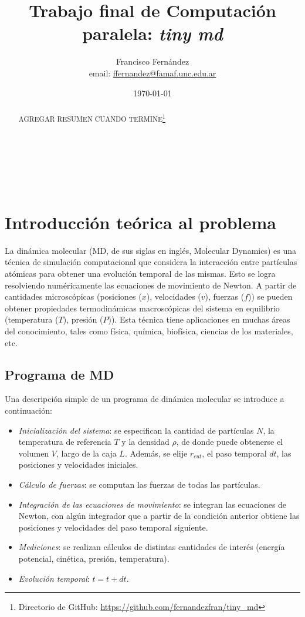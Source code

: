 \documentclass[a4paper,spanish,12pt,twoside]{article}
\title{Trabajo final de Computación paralela: \textit{tiny md}}
\author{Francisco Fernández \\ \small{email: \href{mailto:ffernandez@famaf.unc.edu.ar}{ffernandez@famaf.unc.edu.ar}}}
\date{\today}
\begin{document}
\maketitle

\

\

\begin{abstract}

AGREGAR RESUMEN CUANDO TERMINE\footnote{Directorio de GitHub: \url{https://github.com/fernandezfran/tiny_md}}%


\end{abstract}


\section{Introducción teórica al problema}

La dinámica molecular (MD, de sus siglas en inglés, Molecular Dynamics) es una técnica de simulación computacional que considera la interacción entre partículas atómicas para obtener una evolución temporal de las mismas. Esto se logra resolviendo numéricamente las ecuaciones de movimiento de Newton. A partir de cantidades microscópicas (posiciones ($x$), velocidades ($v$), fuerzas ($f$)) se pueden obtener propiedades termodinámicas macroscópicas del sistema en equilibrio (temperatura ($T$), presión ($P$)). Esta técnica tiene aplicaciones en muchas áreas del conocimiento, tales como física, química, biofísica, ciencias de los materiales, etc.

\subsection{Programa de MD}

Una descripción simple de un programa de dinámica molecular se introduce a continuación:

\begin{itemize}
 \item \textit{Inicialización del sistema}: se especifican la cantidad de partículas $N$, la temperatura de referencia $T$ y la densidad $\rho$, de donde puede obtenerse el volumen $V$, largo de la caja $L$. Además, se elije $r_{cut}$, el paso temporal $dt$, las posiciones y velocidades iniciales.
 \item \textit{Cálculo de fuerzas}: se computan las fuerzas de todas las partículas.
 \item \textit{Integración de las ecuaciones de movimiento}: se integran las ecuaciones de Newton, con algún integrador que a partir de la condición anterior obtiene las posiciones y velocidades del paso temporal siguiente.
 \item \textit{Mediciones}: se realizan cálculos de distintas cantidades de interés (energía potencial, cinética, presión, temperatura).
 \item \textit{Evolución temporal}: $t = t + dt$.
\end{itemize}
\end{document}

